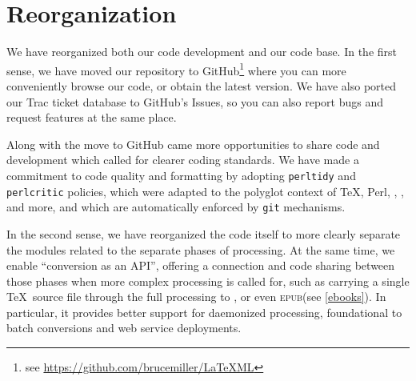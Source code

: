 \documentclass{llncs}
\def\epub{\textsc{epub}\xspace}
\begin{document}

\section{Reorganization}\label{reorganization}
We have reorganized both our code development and our code base.
In the first sense, we have moved our repository to GitHub\footnote{see \url{https://github.com/brucemiller/LaTeXML}} 
where you can more conveniently browse our code, or obtain the latest version.
We have also ported our Trac ticket database to GitHub's Issues,
so you can also report bugs and request features at the same place.

Along with the move to GitHub came more opportunities to share
code and development which called for clearer coding standards.
We have made a commitment to code quality and formatting by
adopting \texttt{perltidy} and \texttt{perlcritic} policies,
which were adapted to the polyglot context of \TeX, Perl, \XML,
\XSLT, and more, and which are automatically enforced by \texttt{git} mechanisms.

In the second sense, we have reorganized the code itself to more clearly
separate the modules related to the separate phases of processing.
At the same time, we enable ``conversion as an API'', offering a connection and code sharing between those phases when more
complex processing is called for, such as carrying a single \TeX\ source
file through the full processing to \HTML, or even \epub (see \ref{ebooks}).
In particular, it provides better support for daemonized processing, foundational to batch conversions and web service deployments.
\end{document}
